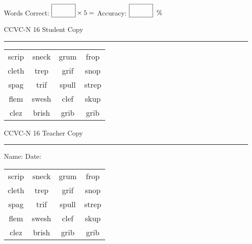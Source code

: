 \documentclass{memoir}
\begin{document}
\small

Words Correct: $\fbox{\phantom{\huge 100}} \times 5 = $ Accuracy: $\fbox{\phantom{\huge 100}}\;\; \%$ 

\vfill

\newpage


\footnotesize \noindent
CCVC-N 16 \hfill Student Copy
\smallskip
\hrule

\Large

\setlength{\tabcolsep}{14pt}
\def\arraystretch{3}

{\selectfont


\begin{vplace}[0.5]
\begin{center}
\begin{tabular}{cccc}
scrip & sneck & grum       & frop \\
cleth & trep & grif      & snop \\
spag          & trif & spull & strep \\
flem & swesh & clef             & skup \\
clez & brish & grib                    & grib     \\
\end{tabular}
\end{center}
\end{vplace}

}

\newpage

\footnotesize \noindent
CCVC-N 16 \hfill Teacher Copy
\smallskip
\hrule

\small

\vfill

\noindent
Name: \underline{\hspace{1.75in}} \hfill Date: \underline{\hspace{1in}}

\Large

{\selectfont


\begin{vplace}[0.5]
\begin{center}
\begin{tabular}{cccc}
scrip & sneck & grum       & frop \\
cleth & trep & grif      & snop \\
spag          & trif & spull & strep \\
flem & swesh & clef             & skup \\
clez & brish & grib                    & grib     \\
\end{tabular}
\end{center}
\end{vplace}



}
\end{document}
